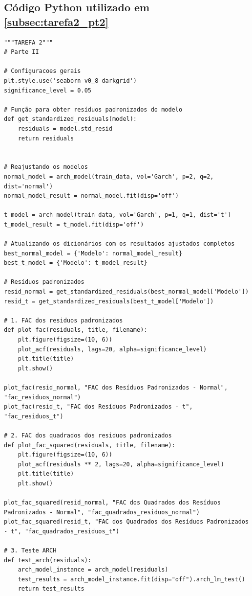 \documentclass[a4paper, 12pt]{article}
\begin{document}
\subsection{Código Python utilizado em \ref{subsec:tarefa2_pt2}}\label{apendice:codigo_tarefa2_pt2}

\begin{lstlisting}[style=python]
"""TAREFA 2"""
# Parte II

# Configuracoes gerais
plt.style.use('seaborn-v0_8-darkgrid')
significance_level = 0.05

# Função para obter resíduos padronizados do modelo
def get_standardized_residuals(model):
    residuals = model.std_resid
    return residuals


# Reajustando os modelos
normal_model = arch_model(train_data, vol='Garch', p=2, q=2, dist='normal')
normal_model_result = normal_model.fit(disp='off')

t_model = arch_model(train_data, vol='Garch', p=1, q=1, dist='t')
t_model_result = t_model.fit(disp='off')

# Atualizando os dicionários com os resultados ajustados completos
best_normal_model = {'Modelo': normal_model_result}
best_t_model = {'Modelo': t_model_result}

# Resíduos padronizados
resid_normal = get_standardized_residuals(best_normal_model['Modelo'])
resid_t = get_standardized_residuals(best_t_model['Modelo'])

# 1. FAC dos residuos padronizados
def plot_fac(residuals, title, filename):
    plt.figure(figsize=(10, 6))
    plot_acf(residuals, lags=20, alpha=significance_level)
    plt.title(title)
    plt.show()

plot_fac(resid_normal, "FAC dos Resíduos Padronizados - Normal", "fac_residuos_normal")
plot_fac(resid_t, "FAC dos Resíduos Padronizados - t", "fac_residuos_t")

# 2. FAC dos quadrados dos residuos padronizados
def plot_fac_squared(residuals, title, filename):
    plt.figure(figsize=(10, 6))
    plot_acf(residuals ** 2, lags=20, alpha=significance_level)
    plt.title(title)
    plt.show()

plot_fac_squared(resid_normal, "FAC dos Quadrados dos Resíduos Padronizados - Normal", "fac_quadrados_residuos_normal")
plot_fac_squared(resid_t, "FAC dos Quadrados dos Resíduos Padronizados - t", "fac_quadrados_residuos_t")

# 3. Teste ARCH
def test_arch(residuals):
    arch_model_instance = arch_model(residuals)
    test_results = arch_model_instance.fit(disp="off").arch_lm_test()
    return test_results


\end{lstlisting}
\end{document}
